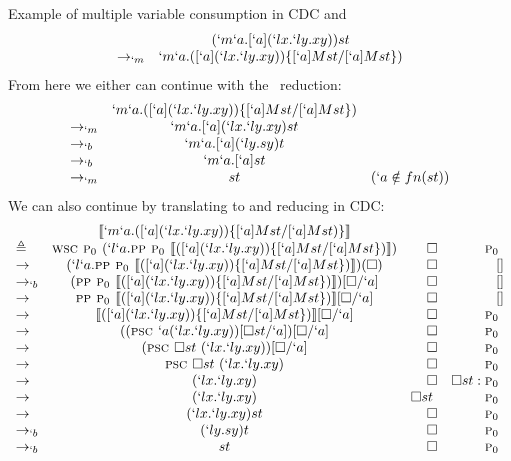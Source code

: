 \begin{example}{Example of multiple variable consumption in CDC and \lmu}
\[
\begin{array}{lcrr}
         & (`m`a.[`a](`lx.`ly.xy))st \\
\to_{`m} & `m`a.([`a](`lx.`ly.xy))\{[`a]Mst/[`a]Mst\}) \\
\end{array}
\]
From here we either can continue with the \lmu\ reduction:
\[
\begin{array}{lcrr}
         & `m`a.([`a](`lx.`ly.xy))\{[`a]Mst/[`a]Mst\}) \\
\to_{`m} & `m`a.[`a](`lx.`ly.xy)st \\
\to_{`b} & `m`a.[`a](`ly.sy)t \\
\to_{`b} & `m`a.[`a]st \\
\to_{`m} & st & (`a \notin fn(st)) \\
\end{array}
\]
We can also continue by translating to and reducing in CDC:
{
\[
\begin{array}{lcrr}
           & \llbracket `m`a.([`a](`lx.`ly.xy))\{[`a]Mst/[`a]Mst)\} \rrbracket \\
\triangleq & \textsc{wsc } \textsc{p$_0$ } (`l`a.\textsc{pp } \textsc{p$_0$ } \llbracket ([`a](`lx.`ly.xy))\{[`a]Mst/[`a]Mst\}) \rrbracket) & \square & \textsc{p$_0$ } \\
\to        & (`l`a.\textsc{pp } \textsc{p$_0$ } \llbracket ([`a](`lx.`ly.xy))\{[`a]Mst/[`a]Mst\}) \rrbracket)(\square) & \square & [] \\
\to_{`b}   & (\textsc{pp } \textsc{p$_0$ } \llbracket ([`a](`lx.`ly.xy))\{[`a]Mst/[`a]Mst\}) \rrbracket)[\square/`a] & \square & [] \\
\to        & \textsc{pp } \textsc{p$_0$ } \llbracket ([`a](`lx.`ly.xy))\{[`a]Mst/[`a]Mst\}) \rrbracket[\square/`a] & \square & [] \\
\to        & \llbracket ([`a](`lx.`ly.xy))\{[`a]Mst/[`a]Mst\}) \rrbracket[\square/`a] & \square & \textsc{p$_0$ } \\
\to        & ((\textsc{psc } `a (`lx.`ly.xy))[\square st/`a])[\square/`a] & \square & \textsc{p$_0$ } \\
\to        & (\textsc{psc } \square st\ (`lx.`ly.xy))[\square/`a] & \square & \textsc{p$_0$ } \\
\to        & \textsc{psc } \square st\ (`lx.`ly.xy) & \square & \textsc{p$_0$ } \\
\to        & (`lx.`ly.xy)   & \square & \square st:\textsc{p$_0$ } \\
\to        & (`lx.`ly.xy)   & \square st\ & \textsc{p$_0$ } \\
\to        & (`lx.`ly.xy)st & \square & \textsc{p$_0$ } \\
\to_{`b}   & (`ly.sy)t & \square & \textsc{p$_0$ } \\
\to_{`b}   & st & \square & \textsc{p$_0$ } \\
\end{array}
\]
}
\end{example}


